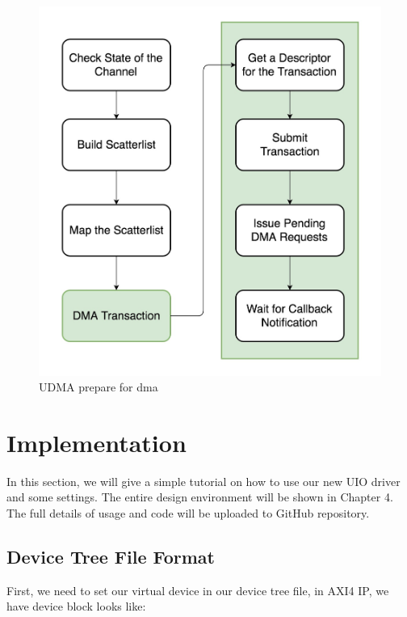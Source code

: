 \begin{figure}[p]
  \centering
  \includegraphics[scale=0.3]{images/udma_prepare_dma.jpg}
  \caption[Udma Prepare for DMA]{UDMA prepare for dma}
  \label{fig:Udma Prepare for DMA}
\end{figure}
\newpage


\section{Implementation}
\label{sec:Implementation}
In this section, we will give a simple tutorial on how to use our new UIO driver and some settings. The entire design environment will be shown in Chapter 4. The full details of usage and code will be uploaded to GitHub repository\cite{mainwork}. 


\subsection{Device Tree File Format}
\label{subsec:Device Tree}
First, we need to set our virtual device in our device tree file, in AXI4 IP, we have device block looks like:

